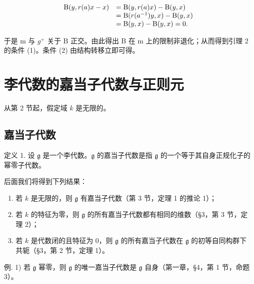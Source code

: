 \[
\begin{array}{r l} \mathrm{B} (y, r (a) x - x) & = \mathrm{B} (y, r (a) x) - \mathrm{B} (y, x) \\ & = \mathrm{B} (r (a ^ {- 1}) y, x) - \mathrm{B} (y, x) \\ & = \mathrm{B} (y, x) - \mathrm{B} (y, x) = 0. \end{array}
\]

于是 m 与 \(g^{+}\) 关于 B 正交。由此得出 B 在 m 上的限制非退化；从而得到引理 2 的条件 (1)。条件 (2) 由结构转移立即可得。

\section{李代数的嘉当子代数与正则元}

从第 2 节起，假定域 \(k\) 是无限的。

\subsection{嘉当子代数}

定义 1. 设 \(\mathfrak{g}\) 是一个李代数。\(\mathfrak{g}\) 的嘉当子代数是指 \(\mathfrak{g}\) 的一个等于其自身正规化子的幂零子代数。

后面我们将得到下列结果：

\begin{enumerate}
\def\labelenumi{\arabic{enumi})}
\item
  若 \(k\) 是无限的，则 \(\mathfrak{g}\) 有嘉当子代数（第 3 节，定理 1 的推论 1）；
\item
  若 \(k\) 的特征为零，则 \(\mathfrak{g}\) 的所有嘉当子代数都有相同的维数（§3，第 3 节，定理 2）；
\item
  若 \(k\) 是代数闭的且特征为 0，则 \(\mathfrak{g}\) 的所有嘉当子代数在 \(\mathfrak{g}\) 的初等自同构群下共轭（§3，第 2 节，定理 1）。
\end{enumerate}

例. 1) 若 \(\mathfrak{g}\) 幂零，则 \(\mathfrak{g}\) 的唯一嘉当子代数是 \(\mathfrak{g}\) 自身（第一章，§4，第 1 节，命题 3）。

